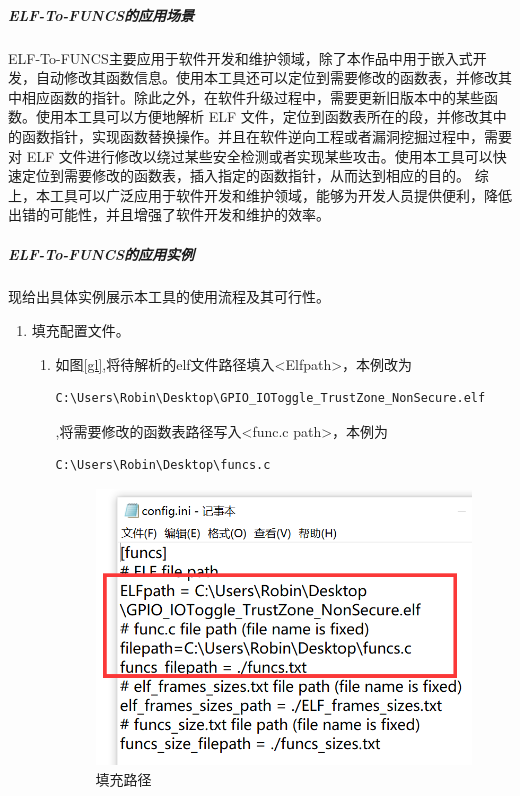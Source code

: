 \documentclass[UTF8,12pt,a4paper]{ctexart}
\numberwithin{figure}{section}
\begin{document}
\subparagraph{ELF-To-FUNCS的应用场景}
\par ELF-To-FUNCS主要应用于软件开发和维护领域，除了本作品中用于嵌入式开发，自动修改其函数信息。使用本工具还可以定位到需要修改的函数表，并修改其中相应函数的指针。除此之外，在软件升级过程中，需要更新旧版本中的某些函数。使用本工具可以方便地解析 ELF 文件，定位到函数表所在的段，并修改其中的函数指针，实现函数替换操作。并且在软件逆向工程或者漏洞挖掘过程中，需要对 ELF 文件进行修改以绕过某些安全检测或者实现某些攻击。使用本工具可以快速定位到需要修改的函数表，插入指定的函数指针，从而达到相应的目的。
综上，本工具可以广泛应用于软件开发和维护领域，能够为开发人员提供便利，降低出错的可能性，并且增强了软件开发和维护的效率。
\subparagraph{ELF-To-FUNCS的应用实例}
\par 现给出具体实例展示本工具的使用流程及其可行性。
\begin{enumerate}
    \item 填充配置文件。
          \begin{enumerate}
              \item 如图\ref{gl},将待解析的elf文件路径填入<Elfpath>，本例改为\begin{verbatim}C:\Users\Robin\Desktop\GPIO_IOToggle_TrustZone_NonSecure.elf\end{verbatim},将需要修改的函数表路径写入<func.c path>，本例为\begin{verbatim}C:\Users\Robin\Desktop\funcs.c\end{verbatim}
                    \begin{figure}
                        \centering
                        \includegraphics[scale=0.4]{graph/gailujing.png}
                        \caption{填充路径}

\end{figure}
\end{enumerate}
\end{enumerate}
\end{document}
